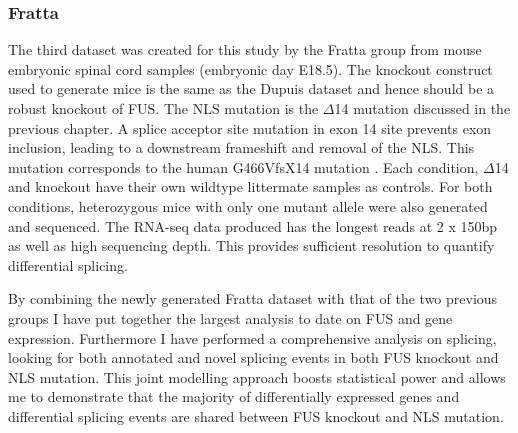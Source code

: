 \subsubsection{Fratta}
The third dataset was created for this study by the Fratta group from mouse embryonic spinal cord samples (embryonic day E18.5).
 The knockout construct used to generate mice is the same as the Dupuis dataset and hence should be a robust knockout of FUS. 
The NLS mutation is the $\Delta$14 mutation discussed in the previous chapter. A splice acceptor site mutation in exon 14 site prevents exon inclusion, leading to a downstream frameshift and removal of the NLS. 
This mutation corresponds to the human G466VfsX14 mutation \citep{DeJesus-Hernandez2010}.
Each condition, $\Delta$14 and knockout have their own wildtype littermate samples as controls. 
For both conditions, heterozygous mice with only one mutant allele were also generated and sequenced.
The RNA-seq data produced has the longest reads at 2 x 150bp as well as high sequencing depth.
This provides sufficient resolution to quantify differential splicing.\newline

By combining the newly generated Fratta dataset with that of the two previous groups I have put together the largest analysis to date on FUS and gene expression. 
Furthermore I have performed a comprehensive analysis on splicing, looking for both annotated and novel splicing events in both FUS knockout and NLS mutation.
This joint modelling approach boosts statistical power and allows me to demonstrate that the majority of differentially expressed genes and differential splicing events are shared between FUS knockout and NLS mutation.

\clearpage

